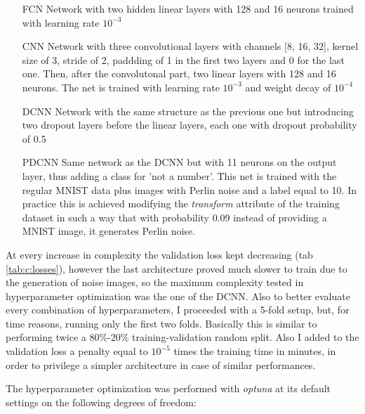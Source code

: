 \documentclass[a4paper, 11pt]{article}
\begin{document}
    \begin{itemize}
      \item [FCN] Network with two hidden linear layers with 128 and 16 neurons trained with learning rate $10^{-3}$
      \item [CNN] Network with three convolutional layers with channels [8, 16, 32], kernel size of 3, stride of 2, paddding of 1 in the first two layers and 0 for the last one. Then, after the convolutonal part, two linear layers with 128 and 16 neurons. The net is trained with learning rate $10^{-3}$ and weight decay of $10^{-4}$
      \item [DCNN] Network with the same structure as the previous one but introducing two dropout layers before the linear layers, each one with dropout probability of 0.5
      \item [PDCNN] Same network as the DCNN but with 11 neurons on the output layer, thus adding a class for 'not a number'. This net is trained with the regular MNIST data plus images with Perlin noise and a label equal to 10. In practice this is achieved modifying the \emph{transform} attribute of the training dataset in such a way that with probability 0.09 instead of providing a MNIST image, it generates Perlin noise.
    \end{itemize}

    At every increase in complexity the validation loss kept decreasing (tab \ref{tab:c:losses}), however the last architecture proved much slower to train due to the generation of noise images, so the maximum complexity tested in hyperparameter optimization was the one of the DCNN. Also to better evaluate every combination of hyperparameters, I proceeded with a 5-fold setup, but, for time reasons, running only the first two folds. Basically this is similar to performing twice a 80\%-20\% training-validation random split. Also I added to the validation loss a penalty equal to $10^{-5}$ times the training time in minutes, in order to privilege a simpler architecture in case of similar performances.

    The hyperparameter optimization was performed with \emph{optuna} at its default settings on the following degrees of freedom:
\end{document}
